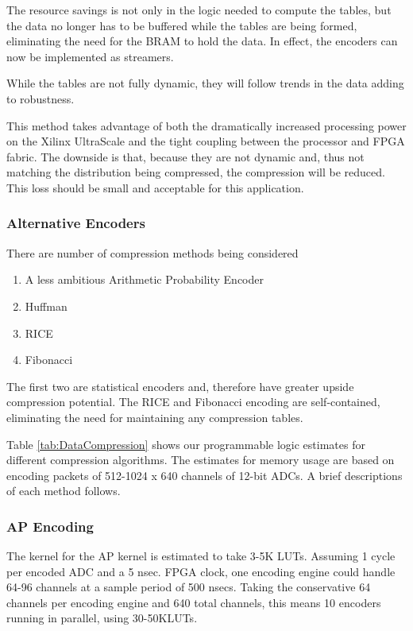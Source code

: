 The resource savings is not only in the logic needed to compute the tables, but the data no longer has to be buffered while the tables are being formed, eliminating the need for the BRAM to hold the data. In effect, the encoders can now be implemented as streamers.

While the tables are not fully dynamic, they will follow trends in the data adding to robustness. 

This method takes advantage of both the dramatically increased processing power on the Xilinx UltraScale and the tight coupling between the processor and FPGA fabric. The downside is that, because they are not dynamic and, thus not matching the distribution being compressed, the compression will be reduced.  This loss should be small and acceptable for this application.

\subsubsection{Alternative Encoders}
There are number of compression methods being considered
\begin{enumerate}
   \item A less ambitious Arithmetic Probability Encoder
   \item Huffman
   \item RICE
   \item Fibonacci 
\end{enumerate}

The first two are statistical encoders and, therefore have greater upside compression potential. The RICE and Fibonacci encoding are self-contained, eliminating the need for maintaining any compression tables. 

Table \ref{tab:DataCompression} shows our programmable logic estimates for different compression algorithms. The estimates for memory usage are based on encoding packets of 512-1024 x 640 channels of 12-bit ADCs. A brief descriptions of each method follows.

\subsubsection{AP Encoding}
The kernel for the AP kernel is estimated to take 3-5K LUTs. Assuming 1 cycle per encoded ADC and a 5 nsec. FPGA clock, one encoding engine could handle 64-96 channels at a sample period of 500 nsecs. Taking the conservative 64 channels per encoding engine and 640 total channels, this means 10 encoders running in parallel, using 30-50KLUTs.

